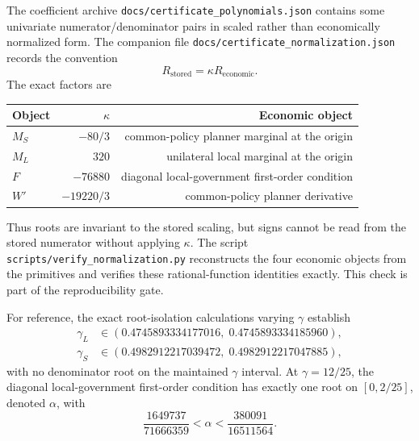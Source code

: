 The coefficient archive \texttt{docs/certificate\_polynomials.json} contains some univariate numerator/denominator pairs in scaled rather than economically normalized form. The companion file \texttt{docs/certificate\_normalization.json} records the convention
\begin{equation}
R_{\mathrm{stored}}=\kappa R_{\mathrm{economic}}.
\end{equation}
The exact factors are
\begin{center}
\begin{tabular}{lrr}
\toprule
Object & $\kappa$ & Economic object \\
\midrule
$M_S$ & $-80/3$ & common-policy planner marginal at the origin \\
$M_L$ & $320$ & unilateral local marginal at the origin \\
$F$ & $-76880$ & diagonal local-government first-order condition \\
$W'$ & $-19220/3$ & common-policy planner derivative \\
\bottomrule
\end{tabular}
\end{center}
Thus roots are invariant to the stored scaling, but signs cannot be read from the stored numerator without applying $\kappa$. The script \texttt{scripts/verify\_normalization.py} reconstructs the four economic objects from the primitives and verifies these rational-function identities exactly. This check is part of the reproducibility gate.

For reference, the exact root-isolation calculations varying $\gamma$ establish
\begin{align}
\gamma_L&\in(0.4745893334177016,\;0.4745893334185960),\\
\gamma_S&\in(0.4982912217039472,\;0.4982912217047885),
\end{align}
with no denominator root on the maintained $\gamma$ interval. At $\gamma=12/25$, the diagonal local-government first-order condition has exactly one root on $[0,2/25]$, denoted $\alpha$, with
\begin{equation}
\frac{1649737}{71666359}<\alpha<\frac{380091}{16511564}.
\label{eq:alpha-exact-interval}
\end{equation}

